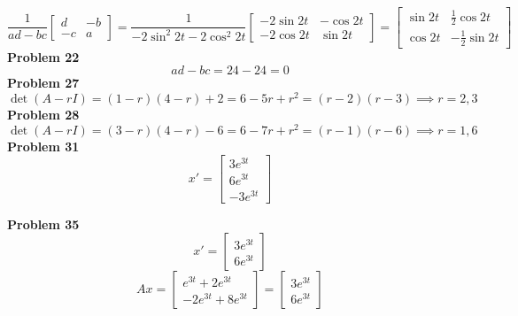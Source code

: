 \[
    \frac{1}{ad-bc}
    \begin{bmatrix}
        d & -b \\
        -c & a
    \end{bmatrix}
    = \frac{1}{-2\sin^2 2t - 2\cos^2 2t}
    \begin{bmatrix}
        -2\sin 2t & -\cos 2t \\
        -2\cos 2t & \sin 2t
    \end{bmatrix}
    = 
    \begin{bmatrix}
        \sin 2t & \frac{1}{2}\cos 2t \\
        \cos 2t & -\frac{1}{2}\sin 2t
    \end{bmatrix}
\]
\textbf{Problem 22}
\[
    ad-bc = 24-24 = 0
\]
\textbf{Problem 27}
\[
    \det(A-rI)
    = (1-r)(4-r) +2
    = 6 - 5r + r^2 
    = (r-2)(r-3)
    \implies r=2,3
\]
\textbf{Problem 28}
\[
    \det(A-rI)
    = (3-r)(4-r) - 6
    = 6 - 7r + r^2 
    = (r-1)(r-6)
    \implies r=1,6
\]
\textbf{Problem 31}
\[
    x' =
    \begin{bmatrix}
        3e^{3t} \\  6e^{3t} \\ -3e^{3t}
    \end{bmatrix}
\]

\textbf{Problem 35}
\[
    x' =
    \begin{bmatrix}
        3e^{3t} \\  6e^{3t} 
    \end{bmatrix}
\]
\[
    Ax =
    \begin{bmatrix}
        e^{3t} + 2e^{3t} \\  
        -2e^{3t} + 8e^{3t}
    \end{bmatrix} =
    \begin{bmatrix}
        3e^{3t} \\  6e^{3t} 
    \end{bmatrix}
\]